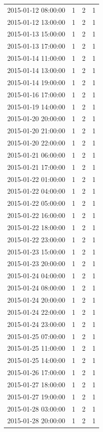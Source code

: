 \begin{tabular}{lrrr}
2015-01-12 08:00:00 & 1 & 2 & 1 \\
2015-01-12 13:00:00 & 1 & 2 & 1 \\
2015-01-13 15:00:00 & 1 & 2 & 1 \\
2015-01-13 17:00:00 & 1 & 2 & 1 \\
2015-01-14 11:00:00 & 1 & 2 & 1 \\
2015-01-14 13:00:00 & 1 & 2 & 1 \\
2015-01-14 19:00:00 & 1 & 2 & 1 \\
2015-01-16 17:00:00 & 1 & 2 & 1 \\
2015-01-19 14:00:00 & 1 & 2 & 1 \\
2015-01-20 20:00:00 & 1 & 2 & 1 \\
2015-01-20 21:00:00 & 1 & 2 & 1 \\
2015-01-20 22:00:00 & 1 & 2 & 1 \\
2015-01-21 06:00:00 & 1 & 2 & 1 \\
2015-01-21 17:00:00 & 1 & 2 & 1 \\
2015-01-22 01:00:00 & 1 & 2 & 1 \\
2015-01-22 04:00:00 & 1 & 2 & 1 \\
2015-01-22 05:00:00 & 1 & 2 & 1 \\
2015-01-22 16:00:00 & 1 & 2 & 1 \\
2015-01-22 18:00:00 & 1 & 2 & 1 \\
2015-01-22 23:00:00 & 1 & 2 & 1 \\
2015-01-23 15:00:00 & 1 & 2 & 1 \\
2015-01-23 20:00:00 & 1 & 2 & 1 \\
2015-01-24 04:00:00 & 1 & 2 & 1 \\
2015-01-24 08:00:00 & 1 & 2 & 1 \\
2015-01-24 20:00:00 & 1 & 2 & 1 \\
2015-01-24 22:00:00 & 1 & 2 & 1 \\
2015-01-24 23:00:00 & 1 & 2 & 1 \\
2015-01-25 07:00:00 & 1 & 2 & 1 \\
2015-01-25 11:00:00 & 1 & 2 & 1 \\
2015-01-25 14:00:00 & 1 & 2 & 1 \\
2015-01-26 17:00:00 & 1 & 2 & 1 \\
2015-01-27 18:00:00 & 1 & 2 & 1 \\
2015-01-27 19:00:00 & 1 & 2 & 1 \\
2015-01-28 03:00:00 & 1 & 2 & 1 \\
2015-01-28 20:00:00 & 1 & 2 & 1 \\

\end{tabular}
